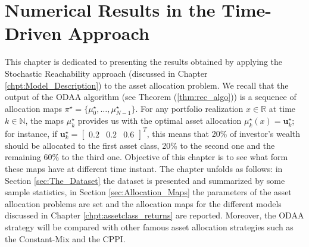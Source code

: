 \chapter{Numerical Results in the Time-Driven Approach}
This chapter is dedicated to presenting the results obtained by applying the Stochastic Reachability approach (discussed in Chapter \ref{chpt:Model_Description}) to the asset allocation problem. We recall that the output of the ODAA algorithm (see Theorem (\ref{thm:rec_algo})) is a sequence of allocation maps $\pi^{\star}=\{\mu_0^{\star},\ldots,\mu_{N-1}^{\star}\}$. For any portfolio realization $x \in \mathbb{R}$ at time $k \in \mathbb{N}$, the maps $\mu_k^{\star}$ provides us with the optimal asset allocation $\mu_k^{\star}(x)=\bm{u}_k^{\star}$; for instance, if $\bm{u}_k^{\star}= \begin{bmatrix}
0.2 & 0.2 & 0.6
\end{bmatrix}^T$, this means that 20\% of investor's wealth should be allocated to the first asset class, 20\% to the second one and the remaining 60\% to the third one. Objective of this chapter is to see what form these maps have at different time instant. The chapter unfolds as follows: in Section \ref{sec:The_Dataset} the dataset is presented and summarized by some sample statistics, in Section \ref{sec:Allocation_Maps} the parameters of the asset allocation problems are set and the allocation maps for the different models discussed in Chapter \ref{chpt:assetclass_returns} are reported. Moreover, the ODAA strategy will be compared with other famous asset allocation strategies such as the Constant-Mix and the \gls{CPPI}.

